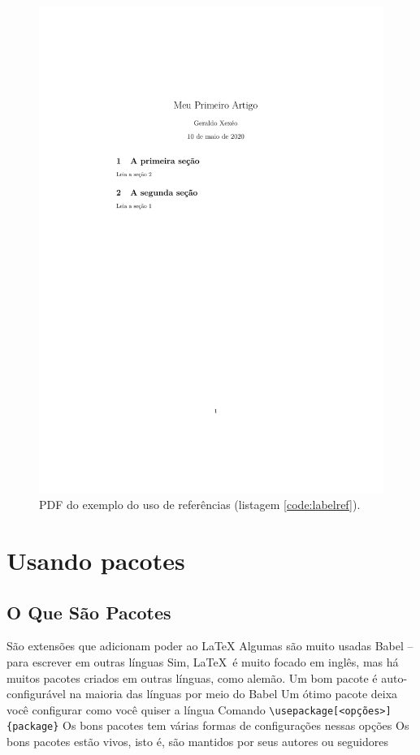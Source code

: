 \begin{figure}
    \centering
    \includegraphics[height=.8\textheight,frame]{labelref}
    \caption{PDF do exemplo do uso de referências (listagem \ref{code:labelref}).}
    \label{fig:labelref}
\end{figure}


\section{Usando pacotes}

\subsection{O Que São Pacotes}
    \begin{outline}
        \1 São extensões que adicionam poder ao \LaTeX
        \1 Algumas são muito usadas
        \2 Babel -- para escrever em outras línguas
        \3 Sim, \LaTeX\ é muito focado em inglês, mas há muitos pacotes criados em outras línguas, como alemão.
        \3 Um bom pacote é auto-configurável na maioria das línguas por meio do Babel
        \3 Um ótimo pacote deixa você configurar como você quiser a língua
        \1 Comando 
        \2 \lstinline|\usepackage[<opções>]{package}|
        \1 Os bons pacotes tem várias formas de configurações nessas opções
        \1 Os bons pacotes estão vivos, isto é, são mantidos por seus autores ou seguidores
    \end{outline}

